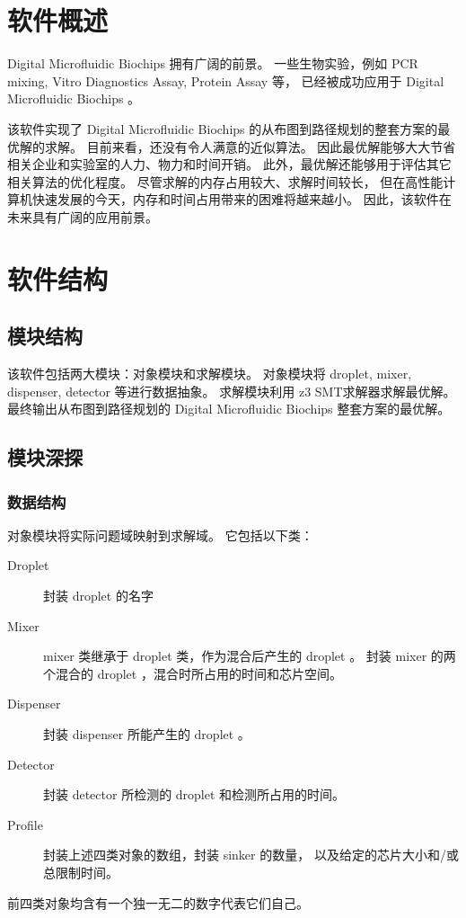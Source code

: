 \documentclass[UTF8, a4paper, titlepage]{ctexart}
\begin{document}
\section{软件概述}
Digital Microfluidic Biochips 拥有广阔的前景。%
一些生物实验，例如 PCR mixing, Vitro Diagnostics Assay, Protein Assay 等，%
已经被成功应用于 Digital Microfluidic Biochips 。%

该软件实现了 Digital Microfluidic Biochips 的从布图到路径规划的整套方案的最优解的求解。%
目前来看，还没有令人满意的近似算法。%
因此最优解能够大大节省相关企业和实验室的人力、物力和时间开销。%
此外，最优解还能够用于评估其它相关算法的优化程度。%
尽管求解的内存占用较大、求解时间较长，%
但在高性能计算机快速发展的今天，内存和时间占用带来的困难将越来越小。%
因此，该软件在未来具有广阔的应用前景。%

\section{软件结构}
\subsection{模块结构}
该软件包括两大模块：对象模块和求解模块。%
对象模块将 droplet, mixer, dispenser, detector 等进行数据抽象。%
求解模块利用 z3 SMT求解器求解最优解。%
最终输出从布图到路径规划的 Digital Microfluidic Biochips 整套方案的最优解。%

\subsection{模块深探}
\subsubsection{数据结构}
对象模块将实际问题域映射到求解域。%
它包括以下类：%
\begin{description}
	\item[Droplet] 封装 droplet 的名字
	\item[Mixer] mixer 类继承于 droplet 类，作为混合后产生的 droplet 。%
	封装 mixer 的两个混合的 droplet ，混合时所占用的时间和芯片空间。
	\item[Dispenser] 封装 dispenser 所能产生的 droplet 。
	\item[Detector] 封装 detector 所检测的 droplet 和检测所占用的时间。
	\item[Profile] 封装上述四类对象的数组，封装 sinker 的数量，%
	以及给定的芯片大小和/或总限制时间。
\end{description}
前四类对象均含有一个独一无二的数字代表它们自己。
\end{document}
